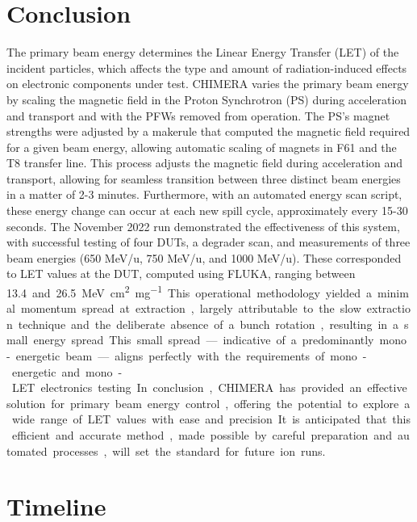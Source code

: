 \documentclass{cernatsnote}
\begin{document}
\section{Conclusion}
The primary beam energy determines the Linear Energy Transfer (LET) of the incident particles, which affects the type and amount of radiation-induced effects on electronic components under test. CHIMERA varies the primary beam energy by scaling the magnetic field in the Proton Synchrotron (PS) during acceleration and transport and with the PFWs removed from operation. The PS's magnet strengths were adjusted by a makerule that computed the magnetic field required for a given beam energy, allowing automatic scaling of magnets in F61 and the T8 transfer line. This process adjusts the magnetic field during acceleration and transport, allowing for seamless transition between three distinct beam energies in a matter of 2-3 minutes. Furthermore, with an automated energy scan script, these energy change can occur at each new spill cycle, approximately every 15-30 seconds. The November 2022 run demonstrated the effectiveness of this system, with successful testing of four DUTs, a degrader scan, and measurements of three beam energies (650 MeV/u, 750 MeV/u, and 1000 MeV/u). These corresponded to LET values at the DUT, computed using FLUKA, ranging between \SI{13.4} and \SI{26.5}{\mega\electronvolt\centi\meter\squared\per\milli\gram}. This operational methodology yielded a minimal momentum spread at extraction, largely attributable to the slow extraction technique and the deliberate absence of a bunch rotation, resulting in a small energy spread. This small spread—indicative of a predominantly mono-energetic beam—aligns perfectly with the requirements of mono-energetic and mono-LET electronics testing. In conclusion, CHIMERA has provided an effective solution for primary beam energy control, offering the potential to explore a wide range of LET values with ease and precision. It is anticipated that this efficient and accurate method, made possible by careful preparation and automated processes, will set the standard for future ion runs.


\section{Timeline}
\end{document}
